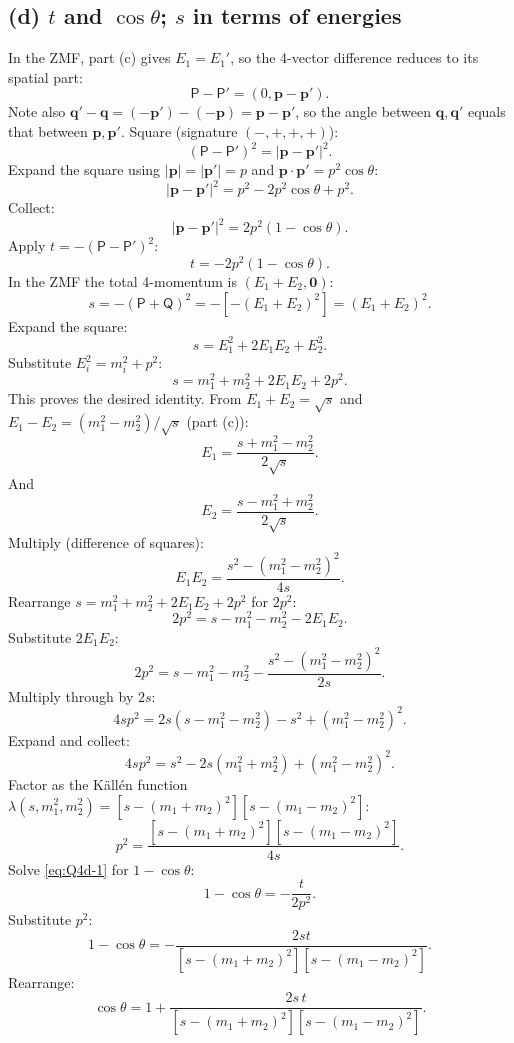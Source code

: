 \documentclass[11pt]{article}
\begin{document}
\subsection*{(d) $t$ and $\cos\theta$; $s$ in terms of energies}

In the ZMF, part (c) gives $E_1=E_1'$, so the 4-vector difference reduces to its spatial part:
\[ \mathsf P-\mathsf P' = (0,\bm p-\bm p'). \]
Note also $\bm q'-\bm q = (-\bm p')-(-\bm p) = \bm p-\bm p'$, so the angle between $\bm q,\bm q'$ equals that between $\bm p,\bm p'$. Square (signature $(-,+,+,+)$):
\[ (\mathsf P-\mathsf P')^2 = |\bm p-\bm p'|^2. \]
Expand the square using $|\bm p|=|\bm p'|=p$ and $\bm p\cdot\bm p' = p^2\cos\theta$:
\[ |\bm p-\bm p'|^2 = p^2 - 2p^2\cos\theta + p^2. \]
Collect:
\[ |\bm p-\bm p'|^2 = 2p^2(1-\cos\theta). \]
Apply $t = -(\mathsf P-\mathsf P')^2$:
\begin{equation}
t = -2p^2(1-\cos\theta).
\label{eq:Q4d-1}
\end{equation}
In the ZMF the total 4-momentum is $(E_1+E_2,\bm 0)$:
\[ s = -(\mathsf P+\mathsf Q)^2 = -[-(E_1+E_2)^2] = (E_1+E_2)^2. \]
Expand the square:
\[ s = E_1^2 + 2E_1 E_2 + E_2^2. \]
Substitute $E_i^2 = m_i^2+p^2$:
\[ s = m_1^2 + m_2^2 + 2E_1 E_2 + 2p^2. \]
This proves the desired identity. From $E_1+E_2=\sqrt s$ and $E_1-E_2=(m_1^2-m_2^2)/\sqrt s$ (part (c)):
\[ E_1 = \frac{s+m_1^2-m_2^2}{2\sqrt s}. \]
And
\[ E_2 = \frac{s-m_1^2+m_2^2}{2\sqrt s}. \]
Multiply (difference of squares):
\[ E_1 E_2 = \frac{s^2 - (m_1^2-m_2^2)^2}{4s}. \]
Rearrange $s = m_1^2+m_2^2+2E_1E_2+2p^2$ for $2p^2$:
\[ 2p^2 = s - m_1^2 - m_2^2 - 2E_1E_2. \]
Substitute $2E_1E_2$:
\[ 2p^2 = s - m_1^2 - m_2^2 - \frac{s^2-(m_1^2-m_2^2)^2}{2s}. \]
Multiply through by $2s$:
\[ 4sp^2 = 2s(s-m_1^2-m_2^2) - s^2 + (m_1^2-m_2^2)^2. \]
Expand and collect:
\[ 4sp^2 = s^2 - 2s(m_1^2+m_2^2) + (m_1^2-m_2^2)^2. \]
Factor as the K\"all\'en function $\lambda(s,m_1^2,m_2^2) = [s-(m_1+m_2)^2][s-(m_1-m_2)^2]$:
\[ p^2 = \frac{[s-(m_1+m_2)^2][s-(m_1-m_2)^2]}{4s}. \]
Solve \eqref{eq:Q4d-1} for $1-\cos\theta$:
\[ 1-\cos\theta = -\frac{t}{2p^2}. \]
Substitute $p^2$:
\[ 1-\cos\theta = -\frac{2st}{[s-(m_1+m_2)^2][s-(m_1-m_2)^2]}. \]
Rearrange:
\begin{equation}
\boxed{\cos\theta = 1 + \frac{2 s\, t}{[s-(m_1+m_2)^2][s-(m_1-m_2)^2]}.}
\end{equation}
\end{document}
